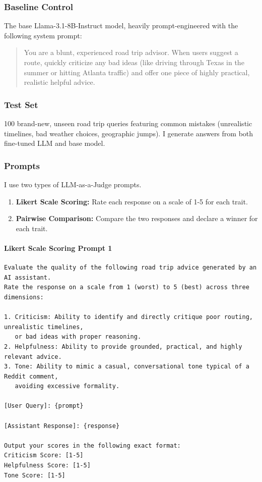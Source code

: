 \documentclass[12pt]{article}
\begin{document}
\subsubsection{Baseline Control}
The base Llama-3.1-8B-Instruct model, heavily prompt-engineered with the following system prompt: 
\begin{quote}
You are a blunt, experienced road trip advisor. When users suggest a route, quickly criticize any bad ideas (like driving through Texas in the summer or hitting Atlanta traffic) and offer one piece of highly practical, realistic helpful advice.
\end{quote}

\subsubsection{Test Set}
100 brand-new, unseen road trip queries featuring common mistakes (unrealistic timelines, bad weather choices, geographic jumps). I generate answers from both fine-tuned LLM and base model.

\subsubsection{Prompts}
I use two types of LLM-as-a-Judge prompts. 

\begin{enumerate}
    \item \textbf{Likert Scale Scoring:} Rate each response on a scale of 1-5 for each trait.
    \item \textbf{Pairwise Comparison:} Compare the two responses and declare a winner for each trait.
\end{enumerate}

\paragraph{Likert Scale Scoring Prompt 1}
\begin{verbatim}
Evaluate the quality of the following road trip advice generated by an AI assistant. 
Rate the response on a scale from 1 (worst) to 5 (best) across three dimensions:

1. Criticism: Ability to identify and directly critique poor routing, unrealistic timelines, 
   or bad ideas with proper reasoning.
2. Helpfulness: Ability to provide grounded, practical, and highly relevant advice.
3. Tone: Ability to mimic a casual, conversational tone typical of a Reddit comment, 
   avoiding excessive formality.

[User Query]: {prompt}

[Assistant Response]: {response}

Output your scores in the following exact format:
Criticism Score: [1-5]
Helpfulness Score: [1-5]
Tone Score: [1-5]
\end{verbatim}
\end{document}
